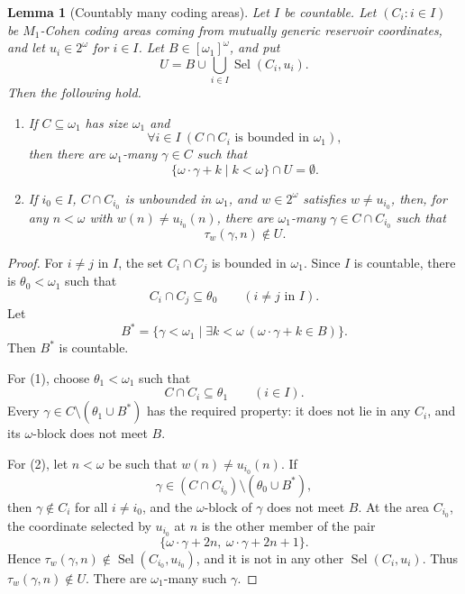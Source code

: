 \documentclass[a4paper,11pt]{article}
\newtheorem{lemma}[theorem]{Lemma}
\begin{document}
\begin{lemma}[Countably many coding areas]\label{lem:countably-many-coding-areas}
Let \(I\) be countable.  Let \((C_i:i\in I)\) be \(M_1\)-Cohen coding areas
coming from mutually generic reservoir coordinates, and let \(u_i\in2^\omega\)
for \(i\in I\).  Let \(B\in[\omega_1]^\omega\), and put
\[
   U=B\cup\bigcup_{i\in I}\operatorname{Sel}(C_i,u_i).
\]
Then the following hold.
\begin{enumerate}
\item If \(C\subseteq\omega_1\) has size \(\omega_1\) and
\[
   \forall i\in I\ (C\cap C_i\text{ is bounded in }\omega_1),
\]
then there are \(\omega_1\)-many \(\gamma\in C\) such that
\[
   \{\omega\cdot\gamma+k\mid k<\omega\}\cap U=\emptyset.
\]

\item If \(i_0\in I\), \(C\cap C_{i_0}\) is unbounded in \(\omega_1\), and
\(w\in2^\omega\) satisfies \(w\ne u_{i_0}\), then, for any
\(n<\omega\) with \(w(n)\ne u_{i_0}(n)\), there are \(\omega_1\)-many
\(\gamma\in C\cap C_{i_0}\) such that
\[
   \tau_w(\gamma,n)\notin U .
\]
\end{enumerate}
\end{lemma}

\begin{proof}
For \(i\ne j\) in \(I\), the set \(C_i\cap C_j\) is bounded in \(\omega_1\).
Since \(I\) is countable, there is \(\theta_0<\omega_1\) such that
\[
   C_i\cap C_j\subseteq\theta_0
   \qquad(i\ne j\text{ in }I).
\]
Let
\[
   B^\ast=\{\gamma<\omega_1\mid
      \exists k<\omega\ (\omega\cdot\gamma+k\in B)\}.
\]
Then \(B^\ast\) is countable.

For (1), choose \(\theta_1<\omega_1\) such that
\[
   C\cap C_i\subseteq\theta_1
   \qquad(i\in I).
\]
Every \(\gamma\in C\setminus(\theta_1\cup B^\ast)\) has the required property:
it does not lie in any \(C_i\), and its \(\omega\)-block does not meet \(B\).

For (2), let \(n<\omega\) be such that \(w(n)\ne u_{i_0}(n)\).  If
\[
   \gamma\in (C\cap C_{i_0})\setminus(\theta_0\cup B^\ast),
\]
then \(\gamma\notin C_i\) for all \(i\ne i_0\), and the \(\omega\)-block of
\(\gamma\) does not meet \(B\).  At the area \(C_{i_0}\), the coordinate
selected by \(u_{i_0}\) at \(n\) is the other member of the pair
\[
   \{\omega\cdot\gamma+2n,\ \omega\cdot\gamma+2n+1\}.
\]
Hence \(\tau_w(\gamma,n)\notin \operatorname{Sel}(C_{i_0},u_{i_0})\), and it is
not in any other \(\operatorname{Sel}(C_i,u_i)\).  Thus
\(\tau_w(\gamma,n)\notin U\).  There are \(\omega_1\)-many such \(\gamma\).
\end{proof}
\end{document}
